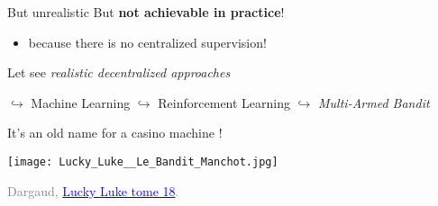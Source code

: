 \begin{frameO}

    \begin{colorblock}{But unrealistic}
        But \textbf{not achievable in practice}!
        \begin{itemize}
            \item \alert{because there is no centralized supervision!}
        \end{itemize}
    \end{colorblock}

    \vspace*{30pt}

    \begin{colorblock}{Let see \emph{realistic decentralized approaches}}

        \(\hookrightarrow\) Machine Learning \newline
        \hspace*{15pt}\(\hookrightarrow\) Reinforcement Learning \newline
        \hspace*{30pt} \(\hookrightarrow\) \emph{Multi-Armed Bandit}

    \end{colorblock}

\end{frameO}



\begin{frameO}
    \begin{center}
        It's an old name for a casino machine \slotmachine{} !
    \end{center}

    \begin{center}
        \texttt{[image: Lucky\_Luke\_\_Le\_Bandit\_Manchot.jpg]}

        \begin{tiny}
            \textcolor{gray}{
                \textcopyright{} Dargaud,
                \href{https://www.dargaud.com/bd/LUCKY-LUKE/Lucky-Luke/Lucky-Luke-tome-18-Bandit-manchot-Le}{\textcolor{blue}{Lucky Luke tome 18}}.
            }
        \end{tiny}
    \end{center}
\end{frameO}



